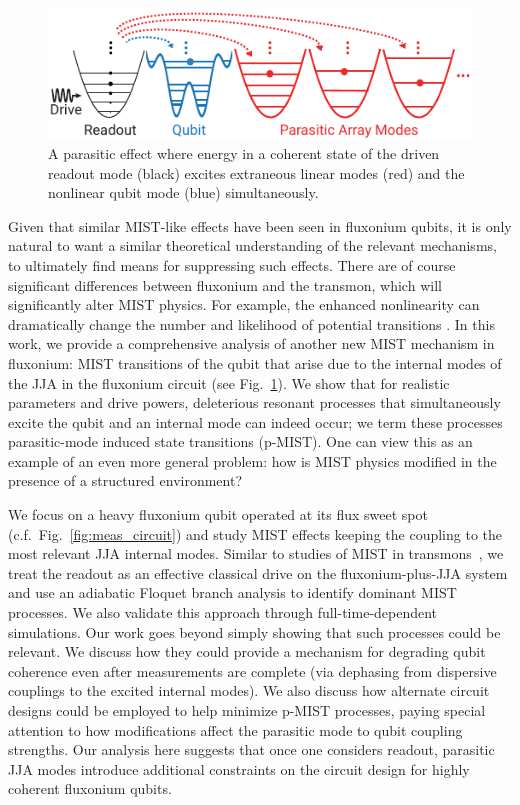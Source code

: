 \documentclass[%
reprint,
superscriptaddress,
 amsmath,amssymb,
 aps,
 prx,
longbibliography,
floatfix,
]{revtex4-2}
\newcommand{\singh}[1]{{\color{orange}{{}#1}}}%
\begin{document}
\begin{figure}
    \centering
    \includegraphics[width=\linewidth]{Figures/Demo.pdf}
    \caption{A parasitic effect where energy in a coherent state of the driven readout mode (black) excites extraneous linear modes (red) and the nonlinear qubit mode (blue) simultaneously. 
    }
    \label{fig:demo}
\end{figure}


Given that similar MIST-like effects have been seen in fluxonium qubits, it is only natural to want a similar theoretical understanding of the relevant mechanisms, to ultimately find means for suppressing such effects.  There are of course significant differences between fluxonium and the transmon, which will significantly alter MIST physics.  For example, the enhanced nonlinearity can dramatically change the number and likelihood of potential transitions \cite{nesterov2024measurement,xiao2023diagrammatic}.  In this work, we provide a comprehensive analysis of another new MIST mechanism in fluxonium:  \singh{additional} MIST transitions of the qubit that arise due to the internal modes of the JJA in the fluxonium circuit (see Fig.~\ref{fig:demo}). We show that for realistic parameters and drive powers, deleterious resonant processes that simultaneously excite the qubit and an internal mode can indeed occur; we term these processes parasitic-mode induced state transitions (p-MIST).  One can view this as an example of an even more general problem: how is MIST physics modified in the presence of a structured environment?  

We focus on a heavy fluxonium qubit operated at its flux sweet spot (c.f.~Fig.~\ref{fig:meas_circuit}) and study MIST effects keeping the coupling to the most relevant JJA internal modes.  Similar to studies of MIST in transmons~\cite{cohen2023reminiscence,dumas2024unified}, we treat the readout as an effective classical drive on the fluxonium-plus-JJA system and use an adiabatic Floquet branch analysis to identify dominant MIST processes. We also validate this approach through full-time-dependent simulations.  
Our work goes beyond simply showing that such processes could be relevant.  We discuss how they could provide a mechanism for degrading qubit coherence even after measurements are complete (via dephasing from dispersive couplings to the excited internal modes).  We also discuss how alternate circuit designs could be employed to help minimize p-MIST processes, paying special attention to how modifications affect the parasitic mode to qubit coupling strengths.  Our analysis here suggests that once one considers readout, parasitic JJA modes introduce additional constraints on the circuit design for highly coherent fluxonium qubits.     
\end{document}

